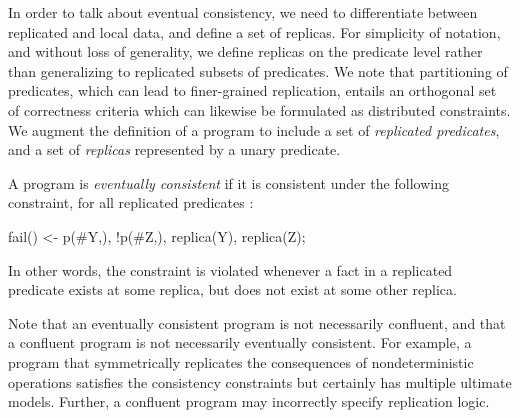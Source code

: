 In order to talk about eventual consistency, we need to differentiate between replicated 
and local
data, and define a set of replicas.  
For simplicity of notation, and without loss of generality, we define replicas on the predicate level rather than generalizing to replicated subsets of predicates.  
We note that partitioning of predicates, which can lead to finer-grained replication, 
entails an orthogonal set of correctness criteria which can likewise be formulated as
distributed constraints.
We augment the definition of a \lang program to include a set of {\em replicated predicates}, and a set of {\em replicas} represented by a unary  predicate.  

\begin{definition}
\label{def:ec}
A \lang program is {\em eventually consistent} if it is consistent under the following constraint, for all replicated predicates :

\begin{Dedalus}
fail() <- p(#Y,), !p(#Z,), replica(Y), replica(Z);
\end{Dedalus}

In other words, the constraint is violated whenever a fact in a replicated predicate exists at some replica, but does not exist at some other replica.
\end{definition}

 



Note that an eventually consistent program is not necessarily confluent, and that
a confluent program is not necessarily eventually consistent.  For example, a program
that symmetrically replicates the consequences of nondeterministic operations satisfies
the consistency constraints but certainly has multiple ultimate models.  Further, a confluent
program may incorrectly specify replication logic.

